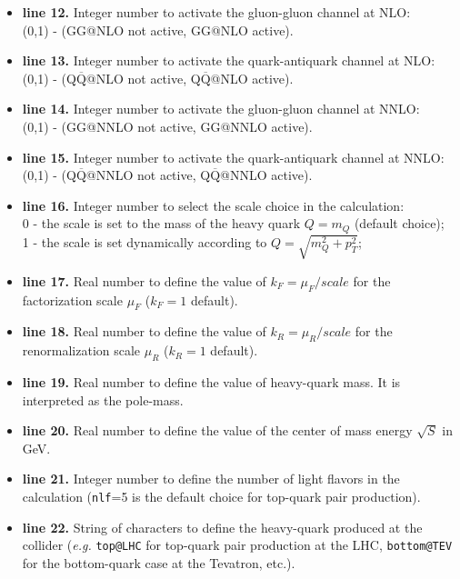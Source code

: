 \documentclass[11pt]{article}
\begin{document}
{\begin{itemize}
\item {\bf line 12.} Integer number to activate the gluon-gluon channel at NLO:
\\
(0,1) - (GG@NLO not active, GG@NLO active).
 
\item {\bf line 13.} Integer number to activate the quark-antiquark channel at NLO:
\\
(0,1) - (Q$\overline{\textrm{Q}}$@NLO not active, Q$\overline{\textrm{Q}}$@NLO active).

\item {\bf line 14.} Integer number to activate the gluon-gluon channel at NNLO:
\\
(0,1) - (GG@NNLO not active, GG@NNLO active).
 
\item {\bf line 15.} Integer number to activate the quark-antiquark channel at NNLO:
\\
(0,1) - (Q$\overline{\textrm{Q}}$@NNLO not active, Q$\overline{\textrm{Q}}$@NNLO active).

\item {\bf line 16.} Integer number to select the scale choice in the calculation:
\\
0 - the scale is set to the mass of the heavy quark $Q=m_Q$ (default choice);
\\
1 - the scale is set dynamically according to $Q=\sqrt{m_Q^2 + p_T^2}$;

\item {\bf line 17.} Real number to define the value of $k_F=\mu_F/scale$ for the factorization scale $\mu_F$ ($k_F=1$ default).

\item {\bf line 18.} Real number to define the value of $k_R=\mu_R/scale$ for the renormalization scale $\mu_R$ ($k_R=1$ default).

\item {\bf line 19.} Real number to define the value of heavy-quark mass. It is interpreted as the pole-mass.

\item {\bf line 20.} Real number to define the value of the center of mass energy $\sqrt{S}$ in GeV.

\item {\bf line 21.} Integer number to define the number of light flavors 
in the calculation (\texttt{nlf}=5 is the default choice for top-quark pair production).

\item {\bf line 22.} String of characters to define the heavy-quark produced 
at the collider ({\it e.g.} \texttt{top@LHC} for top-quark pair production at the LHC, 
\texttt{bottom@TEV} for the bottom-quark case at the Tevatron, etc.).


\end{itemize}}
\end{document}
